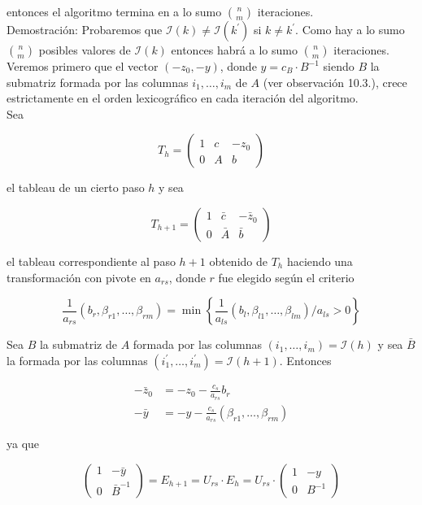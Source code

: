 \documentclass[10pt]{article}
\begin{document}
entonces el algoritmo termina en a lo sumo $\binom{n}{m}$ iteraciones.\\
Demostración: Probaremos que $\mathcal{I}(k) \neq \mathcal{I}\left(k^{\prime}\right)$ si $k \neq k^{\prime}$. Como hay a lo sumo $\binom{n}{m}$ posibles valores de $\mathcal{I}(k)$ entonces habrá a lo sumo $\binom{n}{m}$ iteraciones.\\
Veremos primero que el vector $\left(-z_{0},-y\right)$, donde $y=c_{B} \cdot B^{-1}$ siendo $B$ la submatriz formada por las columnas $i_{1}, \ldots, i_{m}$ de $A$ (ver observación 10.3.), crece estrictamente en el orden lexicográfico en cada iteración del algoritmo.\\
Sea

$$
T_{h}=\left(\begin{array}{cc|c}
1 & c & -z_{0} \\
0 & A & b
\end{array}\right)
$$

el tableau de un cierto paso $h$ y sea

$$
T_{h+1}=\left(\begin{array}{cc|c}
1 & \bar{c} & -\bar{z}_{0} \\
0 & \bar{A} & \bar{b}
\end{array}\right)
$$

el tableau correspondiente al paso $h+1$ obtenido de $T_{h}$ haciendo una transformación con pivote en $a_{r s}$, donde $r$ fue elegido según el criterio

$$
\frac{1}{a_{r s}}\left(b_{r}, \beta_{r 1}, \ldots, \beta_{r m}\right)=\min \left\{\frac{1}{a_{l s}}\left(b_{l}, \beta_{l 1}, \ldots, \beta_{l m}\right) / a_{l s}>0\right\}
$$

Sea $B$ la submatriz de $A$ formada por las columnas $\left(i_{1}, \ldots, i_{m}\right)=\mathcal{I}(h)$ y sea $\bar{B}$ la formada por las columnas $\left(i_{1}^{\prime}, \ldots, i_{m}^{\prime}\right)=\mathcal{I}(h+1)$. Entonces

$$
\begin{aligned}
-\bar{z}_{0} & =-z_{0}-\frac{c_{s}}{a_{r s}} b_{r} \\
-\bar{y} & =-y-\frac{c_{s}}{a_{r s}}\left(\beta_{r 1}, \ldots, \beta_{r m}\right)
\end{aligned}
$$

ya que

$$
\left(\begin{array}{cc}
1 & -\bar{y} \\
0 & \bar{B}^{-1}
\end{array}\right)=E_{h+1}=U_{r s} \cdot E_{h}=U_{r s} \cdot\left(\begin{array}{cc}
1 & -y \\
0 & B^{-1}
\end{array}\right)
$$
\end{document}
